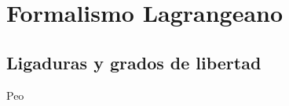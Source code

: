 \documentclass[../main.tex]{subfiles}
\begin{document}
\chapter{Formalismo Lagrangeano}

\section{Ligaduras y grados de libertad}
Peo
\end{document}
